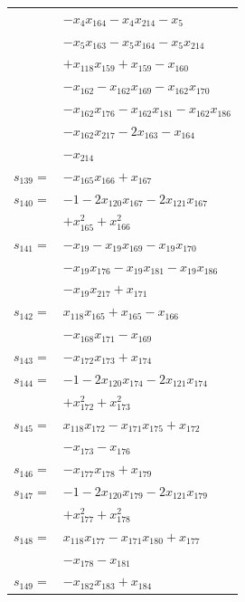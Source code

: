 \begin{longtable}{@{}r@{\;}l@{}}
 & \(\displaystyle -x_{4}x_{164} -x_{4}x_{214} -x_{5}\) \\
 & \(\displaystyle -x_{5}x_{163} -x_{5}x_{164} -x_{5}x_{214}\) \\
 & \(\displaystyle +x_{118}x_{159} +x_{159} -x_{160}\) \\
 & \(\displaystyle -x_{162} -x_{162}x_{169} -x_{162}x_{170}\) \\
 & \(\displaystyle -x_{162}x_{176} -x_{162}x_{181} -x_{162}x_{186}\) \\
 & \(\displaystyle -x_{162}x_{217} -2x_{163} -x_{164}\) \\
 & \(\displaystyle -x_{214}\) \\[3pt]
\(s_{139}=\) & \(\displaystyle -x_{165}x_{166} +x_{167}\) \\[3pt]
\(s_{140}=\) & \(\displaystyle -1 -2x_{120}x_{167} -2x_{121}x_{167}\) \\
 & \(\displaystyle +x_{165}^{2} +x_{166}^{2}\) \\[3pt]
\(s_{141}=\) & \(\displaystyle -x_{19} -x_{19}x_{169} -x_{19}x_{170}\) \\
 & \(\displaystyle -x_{19}x_{176} -x_{19}x_{181} -x_{19}x_{186}\) \\
 & \(\displaystyle -x_{19}x_{217} +x_{171}\) \\[3pt]
\(s_{142}=\) & \(\displaystyle x_{118}x_{165} +x_{165} -x_{166}\) \\
 & \(\displaystyle -x_{168}x_{171} -x_{169}\) \\[3pt]
\(s_{143}=\) & \(\displaystyle -x_{172}x_{173} +x_{174}\) \\[3pt]
\(s_{144}=\) & \(\displaystyle -1 -2x_{120}x_{174} -2x_{121}x_{174}\) \\
 & \(\displaystyle +x_{172}^{2} +x_{173}^{2}\) \\[3pt]
\(s_{145}=\) & \(\displaystyle x_{118}x_{172} -x_{171}x_{175} +x_{172}\) \\
 & \(\displaystyle -x_{173} -x_{176}\) \\[3pt]
\(s_{146}=\) & \(\displaystyle -x_{177}x_{178} +x_{179}\) \\[3pt]
\(s_{147}=\) & \(\displaystyle -1 -2x_{120}x_{179} -2x_{121}x_{179}\) \\
 & \(\displaystyle +x_{177}^{2} +x_{178}^{2}\) \\[3pt]
\(s_{148}=\) & \(\displaystyle x_{118}x_{177} -x_{171}x_{180} +x_{177}\) \\
 & \(\displaystyle -x_{178} -x_{181}\) \\[3pt]
\(s_{149}=\) & \(\displaystyle -x_{182}x_{183} +x_{184}\) \\[3pt]

\end{longtable}

